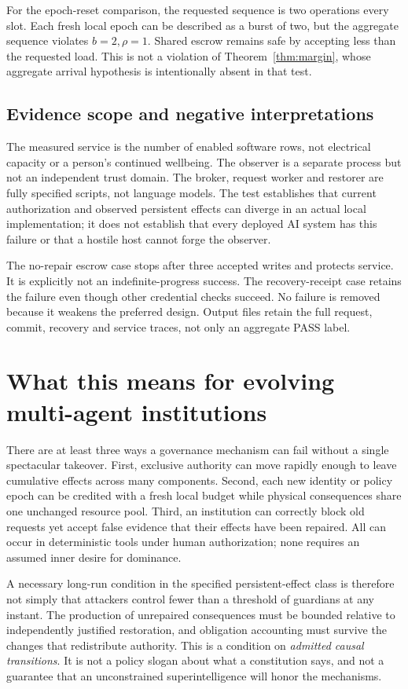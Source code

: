 For the epoch-reset comparison, the requested sequence is two operations every slot. Each fresh local epoch can be described as a burst of two, but the aggregate sequence violates $b=2,\rho=1$. Shared escrow remains safe by accepting less than the requested load. This is not a violation of Theorem~\ref{thm:margin}, whose aggregate arrival hypothesis is intentionally absent in that test.

\subsection{Evidence scope and negative interpretations}
The measured service is the number of enabled software rows, not electrical capacity or a person's continued wellbeing. The observer is a separate process but not an independent trust domain. The broker, request worker and restorer are fully specified scripts, not language models. The test establishes that current authorization and observed persistent effects can diverge in an actual local implementation; it does not establish that every deployed AI system has this failure or that a hostile host cannot forge the observer.

The no-repair escrow case stops after three accepted writes and protects service. It is explicitly not an indefinite-progress success. The recovery-receipt case retains the failure even though other credential checks succeed. No failure is removed because it weakens the preferred design. Output files retain the full request, commit, recovery and service traces, not only an aggregate PASS label.

\section{What this means for evolving multi-agent institutions}
There are at least three ways a governance mechanism can fail without a single spectacular takeover. First, exclusive authority can move rapidly enough to leave cumulative effects across many components. Second, each new identity or policy epoch can be credited with a fresh local budget while physical consequences share one unchanged resource pool. Third, an institution can correctly block old requests yet accept false evidence that their effects have been repaired. All can occur in deterministic tools under human authorization; none requires an assumed inner desire for dominance.

A necessary long-run condition in the specified persistent-effect class is therefore not simply that attackers control fewer than a threshold of guardians at any instant. The production of unrepaired consequences must be bounded relative to independently justified restoration, and obligation accounting must survive the changes that redistribute authority. This is a condition on \emph{admitted causal transitions}. It is not a policy slogan about what a constitution says, and not a guarantee that an unconstrained superintelligence will honor the mechanisms.

